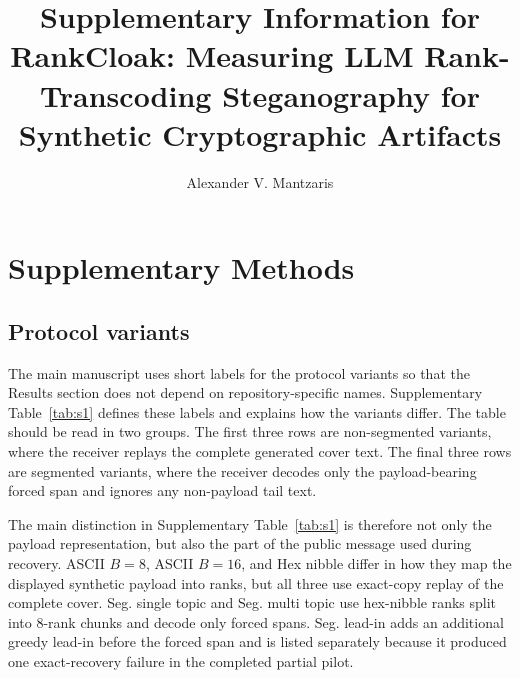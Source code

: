 \documentclass[fleqn,10pt]{wlscirep}
\title{Supplementary Information for\\
RankCloak: Measuring LLM Rank-Transcoding Steganography for Synthetic Cryptographic Artifacts}
\author[1,*]{Alexander V. Mantzaris}
\affil[1]{School of Data, Mathematical, and Statistical Sciences, University of Central Florida, Orlando, FL, United States of America}
\affil[*]{Correspondence: alexander.mantzaris@ucf.edu}
\begin{document}
\maketitle


\section*{Supplementary Methods}

\subsection*{Protocol variants}
The main manuscript uses short labels for the protocol variants so that the Results section does not depend on repository-specific names. Supplementary Table~\ref{tab:s1} defines these labels and explains how the variants differ. The table should be read in two groups. The first three rows are non-segmented variants, where the receiver replays the complete generated cover text. The final three rows are segmented variants, where the receiver decodes only the payload-bearing forced span and ignores any non-payload tail text.

The main distinction in Supplementary Table~\ref{tab:s1} is therefore not only the payload representation, but also the part of the public message used during recovery. ASCII \(B=8\), ASCII \(B=16\), and Hex nibble differ in how they map the displayed synthetic payload into ranks, but all three use exact-copy replay of the complete cover. Seg. single topic and Seg. multi topic use hex-nibble ranks split into 8-rank chunks and decode only forced spans. Seg. lead-in adds an additional greedy lead-in before the forced span and is listed separately because it produced one exact-recovery failure in the completed partial pilot.
\end{document}
